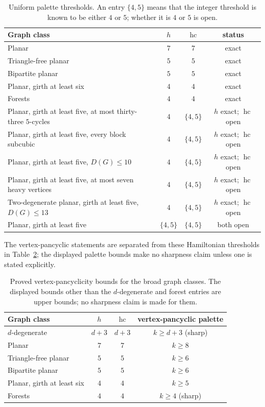 \documentclass[11pt]{article}
\theoremstyle{remark}
\newcommand{\hc}{\operatorname{hc}}
\numberwithin{equation}{section}
\numberwithin{table}{section}
\begin{document}
\begin{table}[htbp]
\centering\small
\caption{Uniform palette thresholds.  An entry $\{4,5\}$ means that the
integer threshold is known to be either $4$ or $5$; whether it is $4$ or
$5$ is open.}
\label{tab:thresholds}
\begin{tabularx}{0.94\linewidth}{@{}Xccc@{}}
\toprule
Graph class & $h$ & $\hc$ & status\\
\midrule
Planar & $7$ & $7$ & exact\\
Triangle-free planar & $5$ & $5$ & exact\\
Bipartite planar & $5$ & $5$ & exact\\
Planar, girth at least six & $4$ & $4$ & exact\\
Forests & $4$ & $4$ & exact\\
Planar, girth at least five, at most thirty-three $5$-cycles
  & $4$ & $\{4,5\}$ & $h$ exact; $\hc$ open\\
Planar, girth at least five, every block subcubic
  & $4$ & $\{4,5\}$ & $h$ exact; $\hc$ open\\
Planar, girth at least five, $D(G)\le10$
  & $4$ & $\{4,5\}$ & $h$ exact; $\hc$ open\\
Planar, girth at least five, at most seven heavy vertices
  & $4$ & $\{4,5\}$ & $h$ exact; $\hc$ open\\
Two-degenerate planar, girth at least five, $D(G)\le13$
  & $4$ & $\{4,5\}$ & $h$ exact; $\hc$ open\\
Planar, girth at least five
  & $\{4,5\}$ & $\{4,5\}$ & both open\\
\bottomrule
\end{tabularx}
\end{table}

The vertex-pancyclic statements are separated from these Hamiltonian
thresholds in Table~\ref{tab:vertex-pancyclic}; the displayed palette
bounds make no sharpness claim unless one is stated explicitly.
\begin{table}[htbp]
\centering\small
\caption{Proved vertex-pancyclicity bounds for the broad graph classes.
The displayed bounds other than the $d$-degenerate and forest entries are
upper bounds; no sharpness claim is made for them.}
\label{tab:vertex-pancyclic}
\begin{tabularx}{0.94\linewidth}{@{}Xccc@{}}
\toprule
Graph class & $h$ & $\hc$ & vertex-pancyclic palette\\
\midrule
$d$-degenerate & $d+3$ & $d+3$ & $k\ge d+3$ (sharp)\\
Planar & $7$ & $7$ & $k\ge8$\\
Triangle-free planar & $5$ & $5$ & $k\ge6$\\
Bipartite planar & $5$ & $5$ & $k\ge6$\\
Planar, girth at least six & $4$ & $4$ & $k\ge5$\\
Forests & $4$ & $4$ & $k\ge4$ (sharp)\\
\bottomrule
\end{tabularx}
\end{table}
\end{document}
